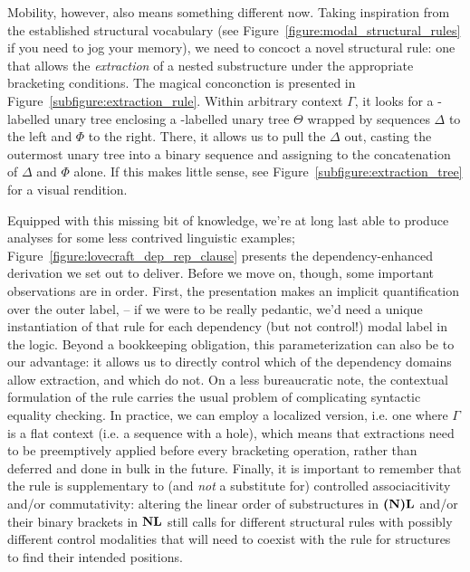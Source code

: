 Mobility, however, also means something different now.
Taking inspiration from the established structural vocabulary (see Figure~\ref{figure:modal_structural_rules} if you need to jog your memory), we need to concoct a novel structural rule: one that allows the \textit{extraction} of a nested substructure under the appropriate bracketing conditions.
The magical conconction is presented in Figure~\ref{subfigure:extraction_rule}.
Within arbitrary context $\Gamma$, it looks for a -labelled unary tree enclosing a -labelled unary tree $\Theta$ wrapped by sequences $\Delta$ to the left and $\Phi$ to the right.
There, it allows us to pull the $\Delta$ out, casting the outermost unary tree into a binary sequence and assigning  to the concatenation of $\Delta$ and $\Phi$ alone. 
If this makes little sense, see Figure~\ref{subfigure:extraction_tree} for a visual rendition.

Equipped with this missing bit of knowledge, we're at long last able to produce analyses for some less contrived linguistic examples; Figure~\ref{figure:lovecraft_dep_rep_clause} presents the dependency-enhanced derivation we set out to deliver.
Before we move on, though, some important observations are in order.
First, the presentation makes an implicit quantification over the outer label,  -- if we were to be really pedantic, we'd need a unique instantiation of that rule for each dependency (but not control!) modal label in the logic.
Beyond a bookkeeping obligation, this parameterization can also be to our advantage: it allows us to directly control which of the dependency domains allow extraction, and which do not.
On a less bureaucratic note, the contextual formulation of the rule carries the usual problem of complicating syntactic equality checking. 
In practice, we can employ a localized version, i.e. one where $\Gamma$ is a flat context (i.e. a sequence with a hole), which means that extractions need to be preemptively applied before every bracketing operation, rather than deferred and done in bulk in the future.
Finally, it is important to remember that the rule is supplementary to (and \textit{not} a substitute for) controlled associacitivity and/or commutativity: altering the linear order of substructures in $\textbf{(N)L}$ and/or their binary brackets in $\textbf{NL}$ still calls for different structural rules with possibly different control modalities that will need to coexist with the \Extraction{} rule for structures to find their intended positions.



